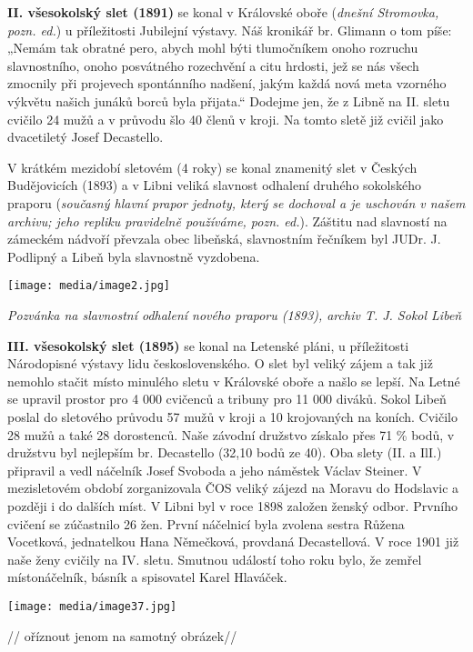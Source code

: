 \textbf{II. všesokolský slet (1891)} se konal v Královské oboře
(\emph{dnešní Stromovka, pozn. ed.}) u příležitosti Jubilejní výstavy.
Náš kronikář br. Glimann o tom píše: „Nemám tak obratné pero, abych mohl
býti tlumočníkem onoho rozruchu slavnostního, onoho posvátného
rozechvění a citu hrdosti, jež se nás všech zmocnily při projevech
spontánního nadšení, jakým každá nová meta vzorného výkvětu našich
junáků borců byla přijata.`` Dodejme jen, že z Libně na II. sletu
cvičilo 24 mužů a v průvodu šlo 40 členů v kroji. Na tomto sletě již
cvičil jako dvacetiletý Josef Decastello.

V krátkém mezidobí sletovém (4 roky) se konal znamenitý slet v Českých
Budějovicích (1893) a v Libni veliká slavnost odhalení druhého
sokolského praporu (\emph{současný hlavní prapor jednoty, který se
dochoval a je uschován v našem archivu; jeho repliku pravidelně
používáme, pozn. ed.}). Záštitu nad slavností na zámeckém nádvoří
převzala obec libeňská, slavnostním řečníkem byl JUDr. J. Podlipný a
Libeň byla slavnostně vyzdobena.

\texttt{[image: media/image2.jpg]}

\emph{Pozvánka na slavnostní odhalení nového praporu (1893), archiv T.
J. Sokol Libeň}

\textbf{III. všesokolský slet (1895)} se konal na Letenské pláni, u
příležitosti Národopisné výstavy lidu československého. O slet byl
veliký zájem a tak již nemohlo stačit místo minulého sletu v Královské
oboře a našlo se lepší. Na Letné se upravil prostor pro 4 000 cvičenců a
tribuny pro 11 000 diváků. Sokol Libeň poslal do sletového průvodu 57
mužů v kroji a 10 krojovaných na koních. Cvičilo 28 mužů a také 28
dorostenců. Naše závodní družstvo získalo přes 71 \% bodů, v družstvu
byl nejlepším br. Decastello (32,10 bodů ze 40). Oba slety (II. a IlI.)
připravil a vedl náčelník Josef Svoboda a jeho náměstek Václav Steiner.
V mezisletovém období zorganizovala ČOS veliký zájezd na Moravu do
Hodslavic a později i do dalších míst. V Libni byl v roce 1898 založen
ženský odbor. Prvního cvičení se zúčastnilo 26 žen. První náčelnicí byla
zvolena sestra Růžena Vocetková, jednatelkou Hana Němečková, provdaná
Decastellová. V roce 1901 již naše ženy cvičily na IV. sletu. Smutnou
událostí toho roku bylo, že zemřel místonáčelník, básník a spisovatel
Karel Hlaváček.

\texttt{[image: media/image37.jpg]}

// oříznout jenom na samotný obrázek//


